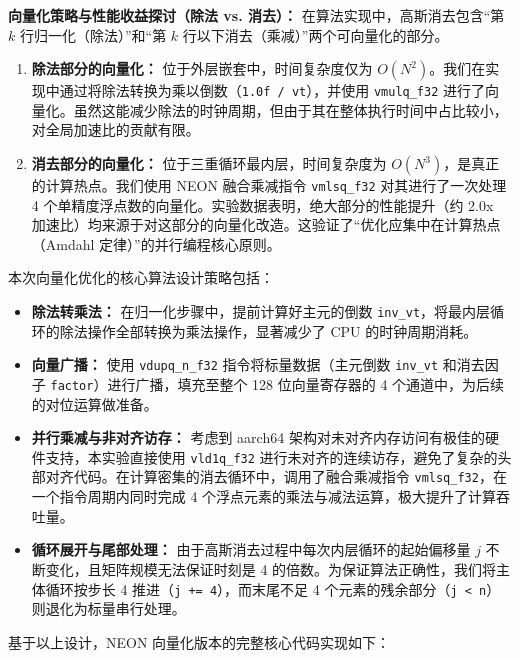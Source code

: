 \documentclass[a4paper]{article}
\begin{document}
\textbf{向量化策略与性能收益探讨（除法 vs. 消去）：}
在算法实现中，高斯消去包含“第 $k$ 行归一化（除法）”和“第 $k$ 行以下消去（乘减）”两个可向量化的部分。
\begin{enumerate}
    \item \textbf{除法部分的向量化：} 位于外层嵌套中，时间复杂度仅为 $O(N^2)$。我们在实现中通过将除法转换为乘以倒数（\texttt{1.0f / vt}），并使用 \texttt{vmulq\_f32} 进行了向量化。虽然这能减少除法的时钟周期，但由于其在整体执行时间中占比较小，对全局加速比的贡献有限。
    \item \textbf{消去部分的向量化：} 位于三重循环最内层，时间复杂度为 $O(N^3)$，是真正的计算热点。我们使用 NEON 融合乘减指令 \texttt{vmlsq\_f32} 对其进行了一次处理 4 个单精度浮点数的向量化。实验数据表明，绝大部分的性能提升（约 2.0x 加速比）均来源于对这部分的向量化改造。这验证了“优化应集中在计算热点（Amdahl 定律）”的并行编程核心原则。
\end{enumerate}

本次向量化优化的核心算法设计策略包括：
\begin{itemize}
    \item \textbf{除法转乘法：} 在归一化步骤中，提前计算好主元的倒数 \texttt{inv\_vt}，将最内层循环的除法操作全部转换为乘法操作，显著减少了 CPU 的时钟周期消耗。
    \item \textbf{向量广播：} 使用 \texttt{vdupq\_n\_f32} 指令将标量数据（主元倒数 \texttt{inv\_vt} 和消去因子 \texttt{factor}）进行广播，填充至整个 128 位向量寄存器的 4 个通道中，为后续的对位运算做准备。
    \item \textbf{并行乘减与非对齐访存：} 考虑到 aarch64 架构对未对齐内存访问有极佳的硬件支持，本实验直接使用 \texttt{vld1q\_f32} 进行未对齐的连续访存，避免了复杂的头部对齐代码。在计算密集的消去循环中，调用了融合乘减指令 \texttt{vmlsq\_f32}，在一个指令周期内同时完成 4 个浮点元素的乘法与减法运算，极大提升了计算吞吐量。
    \item \textbf{循环展开与尾部处理：} 由于高斯消去过程中每次内层循环的起始偏移量 $j$ 不断变化，且矩阵规模无法保证时刻是 4 的倍数。为保证算法正确性，我们将主体循环按步长 4 推进（\texttt{j += 4}），而末尾不足 4 个元素的残余部分（\texttt{j < n}）则退化为标量串行处理。
\end{itemize}

基于以上设计，NEON 向量化版本的完整核心代码实现如下：
\end{document}
